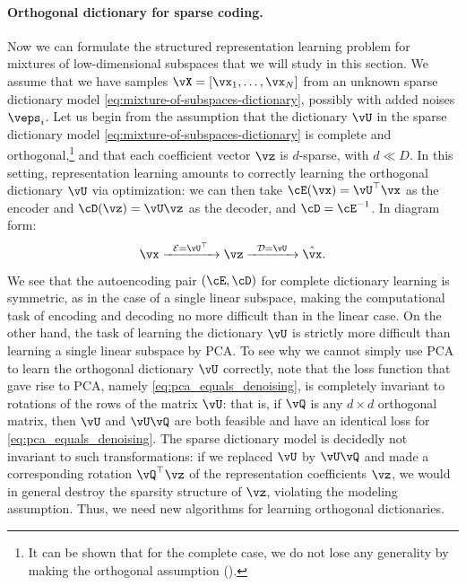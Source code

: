 \documentclass[../../book-main.tex]{subfiles}
\begin{document}
\paragraph{Orthogonal dictionary for sparse coding.}
Now we can formulate the structured representation learning problem
for mixtures of low-dimensional subspaces that we will study in this section.
We assume that we have samples $\vX = [\vx_1, \dots, \vx_N]$ from an
unknown sparse dictionary model
\eqref{eq:mixture-of-subspaces-dictionary}, possibly with added
noises $\veps_i$.
Let us begin from the assumption that the dictionary $\vU$ in the sparse
dictionary model \eqref{eq:mixture-of-subspaces-dictionary} is complete and
orthogonal,\footnote{It can be shown that for the complete case, we
    do not lose any generality by making the orthogonal assumption
().} and that each coefficient vector $\vz$
is $d$-sparse, with $d \ll D$.
In this setting, representation learning amounts to correctly
learning the orthogonal dictionary $\vU$ via optimization: we
can then take $\cE(\vx) = \vU^\top \vx$ as the encoder and $\cD(\vz) = \vU \vz$
as the decoder, and $\cD = \cE^{-1}$. In diagram form:
\begin{equation}
    \vx \xrightarrow{\hspace{2mm} \mathcal{E} = \vU^\top
    \hspace{2mm}}  \vz \xrightarrow{\hspace{2mm} \mathcal{D} = \vU
    \hspace{2mm}}   \hat{\vx}.
    \label{eqn:autoencoding-DL}
\end{equation}
We see that the autoencoding pair $(\cE, \cD)$ for complete
dictionary learning is symmetric, as in the case of a single linear
subspace, making the computational task of encoding and decoding no
more difficult than in the linear case. On the other hand, the task
of learning the dictionary $\vU$ is strictly more difficult than
learning a single linear subspace by PCA.
To see why we cannot simply use PCA to learn the orthogonal
dictionary $\vU$ correctly, note that the
loss function that gave rise to PCA, namely \eqref{eq:pca_equals_denoising}, is
completely invariant to rotations of the rows of the matrix $\vU$: that is, if
$\vQ$ is any $d \times d$ orthogonal matrix, then $\vU$ and $\vU \vQ$ are both
feasible and have an identical loss for \eqref{eq:pca_equals_denoising}. The
sparse dictionary model is decidedly not invariant to such transformations: if
we replaced $\vU$ by $\vU \vQ$ and made a corresponding rotation $\vQ^\top \vz$
of the representation coefficients $\vz$, we would in general destroy
the sparsity structure of $\vz$, violating the modeling assumption.
Thus, we need new algorithms for learning orthogonal dictionaries.
\end{document}
